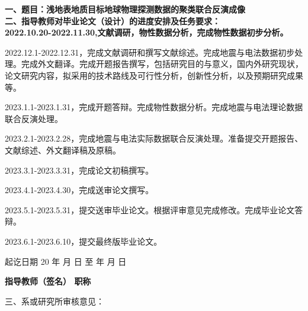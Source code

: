 \cleardoublepage{}

{
    \bfseries
    \noindent 一、题目：浅地表地质目标地球物理探测数据的聚类联合反演成像\\
    \noindent 二、指导教师对毕业论文（设计）的进度安排及任务要求：\\

    2022.10.20-2022.11.30,文献调研，物性数据分析，完成物性数据初步分析。

2022.12.1-2022.12.31，完成文献调研和撰写文献综述。完成地震与电法数据初步处理。完成外文翻译。完成开题报告撰写，包括研究目的与意义，国内外研究现状，论文研究内容，拟采用的技术路线及可行性分析，创新性分析，以及预期研究成果等。

2023.1.1-2023.1.31，完成开题答辩。完成物性数据分析。完成地震与电法理论数据联合反演处理。

2023.2.1-2023.2.28，完成地震与电法实际数据联合反演处理。准备提交开题报告、文献综述、外文翻译稿及原稿。

2023.3.1-2023.3.31，完成论文初稿撰写。

2023.4.1-2023.4.30，完成送审论文撰写。

2023.5.1-2023.5.31，提交送审毕业论文。根据评审意见完成修改。完成毕业论文答辩。

2023.6.1-2023.6.10，提交最终版毕业论文。

    \vskip 20mm

    \noindent 起讫日期 20 \quad 年 \quad  月 \quad  日 \quad 至  \quad  年 \quad  月  \quad 日
    \begin{flushright}
        \bfseries {}
            指导教师（签名） \underline{} 职称 \underline{}
    \end{flushright}

    \noindent 三、系或研究所审核意见：\\

    \mbox{} \vfill
    \signature{负责人（签名）}
}
